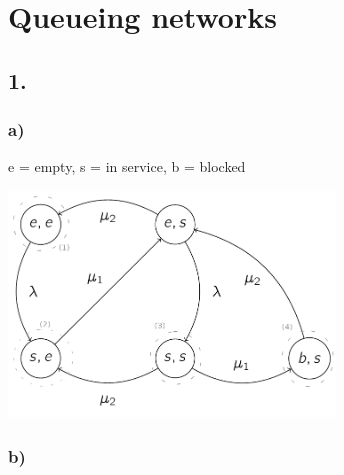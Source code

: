 \section{Queueing networks}

\subsection*{1.}

\subsubsection*{a)}

e = empty, s = in service, b = blocked

\includegraphics[width=0.65\textwidth]{pics/queue_nets_1_a.png}

\subsubsection*{b)}


